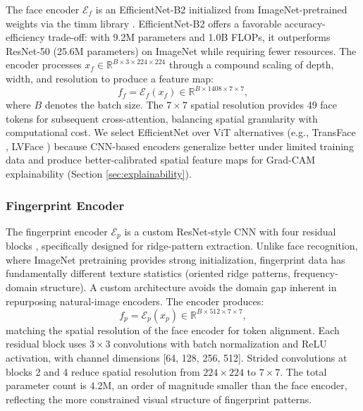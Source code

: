 \documentclass[10pt,journal,compsoc]{IEEEtran}
\begin{document}
The face encoder $\mathcal{E}_f$ is an EfficientNet-B2 \cite{tan2019efficientnet} initialized from ImageNet-pretrained weights via the timm library \cite{wightman2019timm}. EfficientNet-B2 offers a favorable accuracy-efficiency trade-off: with 9.2M parameters and 1.0B FLOPs, it outperforms ResNet-50 (25.6M parameters) on ImageNet while requiring fewer resources. The encoder processes $x_f \in \mathbb{R}^{B \times 3 \times 224 \times 224}$ through a compound scaling of depth, width, and resolution to produce a feature map:
\begin{equation}
\label{eq:face_encoder}
f_f = \mathcal{E}_f(x_f) \in \mathbb{R}^{B \times 1408 \times 7 \times 7},
\end{equation}
where $B$ denotes the batch size. The $7 \times 7$ spatial resolution provides 49 face tokens for subsequent cross-attention, balancing spatial granularity with computational cost. We select EfficientNet over ViT alternatives (e.g., TransFace \cite{dan2023transface}, LVFace \cite{you2025lvface}) because CNN-based encoders generalize better under limited training data and produce better-calibrated spatial feature maps for Grad-CAM explainability (Section \ref{sec:explainability}).

\subsubsection{Fingerprint Encoder}

The fingerprint encoder $\mathcal{E}_p$ is a custom ResNet-style CNN with four residual blocks \cite{he2016deep}, specifically designed for ridge-pattern extraction. Unlike face recognition, where ImageNet pretraining provides strong initialization, fingerprint data has fundamentally different texture statistics (oriented ridge patterns, frequency-domain structure). A custom architecture avoids the domain gap inherent in repurposing natural-image encoders. The encoder produces:
\begin{equation}
\label{eq:fingerprint_encoder}
f_p = \mathcal{E}_p(x_p) \in \mathbb{R}^{B \times 512 \times 7 \times 7},
\end{equation}
matching the spatial resolution of the face encoder for token alignment. Each residual block uses $3 \times 3$ convolutions with batch normalization \cite{ioffe2015batch} and ReLU activation, with channel dimensions [64, 128, 256, 512]. Strided convolutions at blocks 2 and 4 reduce spatial resolution from $224 \times 224$ to $7 \times 7$. The total parameter count is 4.2M, an order of magnitude smaller than the face encoder, reflecting the more constrained visual structure of fingerprint patterns.
\end{document}
